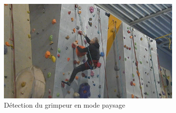 \documentclass[a4paper, 11pt, french]{article}
\begin{document}
\begin{figure}[!ht]
     \begin{center}
        \begin{subfigure}[t]{0.70\textwidth}
            \includegraphics[width=\textwidth]{exemplePaysage.png}
            \caption{Détection du grimpeur en mode paysage}
            \label{fig:test1}
        \end{subfigure}
        \begin{subfigure}[t]{0.22\textwidth}
            \centering

\end{subfigure}
\end{center}
\end{figure}
\end{document}
